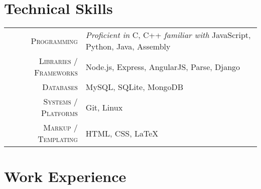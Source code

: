\documentclass[a4paper,11pt]{extarticle} %
\begin{document}

\section{Technical Skills}

\begin{tabular}{r|p{15cm}}
\textsc{Programming} & \textit{Proficient in} C, C++ \textit{familiar with} JavaScript, Python, Java, Assembly \\
\textsc{Libraries / Frameworks} & Node.js, Express, AngularJS, Parse, Django\\
\textsc{Databases} & MySQL, SQLite, MongoDB\\
\textsc{Systems / Platforms} & Git, Linux\\
\textsc{Markup / Templating} & HTML, CSS, LaTeX
\end{tabular}

\section{Work Experience}
\end{document}
